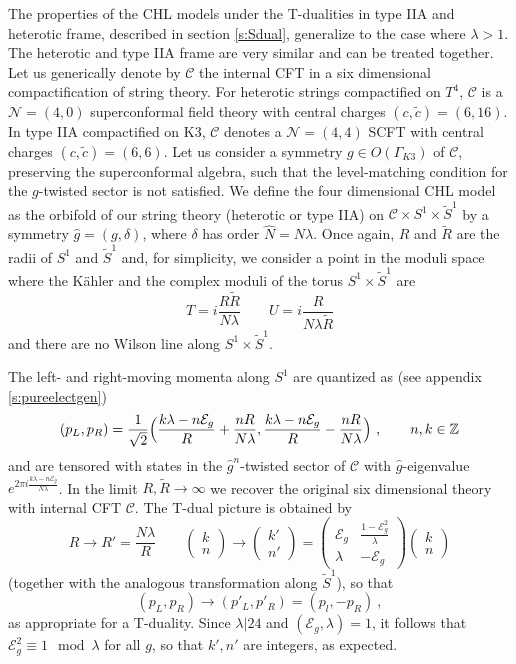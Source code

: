 \documentclass[a4paper,11pt]{article}
\newcommand{\ZZ}{\mathbb{Z}}
\newcommand{\C}{\mathcal{C}}
\newcommand{\E}{\mathcal{E}}
\newcommand{\N}{\mathcal{N}}
\numberwithin{equation}{section}
\def\be{\begin{equation}}
\def\ee{\end{equation}}
\begin{document}
The properties of the CHL models under the T-dualities in type IIA and heterotic frame, described in section \ref{s:Sdual}, generalize to the case where $\lambda>1$. The heterotic and type IIA frame are very similar and can be treated together. Let us generically denote by $\C$ the internal CFT in a six dimensional compactification of string theory. For heterotic strings compactified on $T^4$, $\C$ is a $\N=(4,0)$ superconformal field theory with central charges $(c,\tilde c)=(6,16)$. In type IIA compactified on K3, $\C$ denotes a $\N=(4,4)$ SCFT with central charges $(c,\tilde c)=(6,6)$. Let us consider a symmetry $g\in O(\Gamma_{K3})$ of $\C$, preserving the superconformal algebra, such that the level-matching condition for the $g$-twisted sector is not satisfied. We define the four dimensional CHL model as the orbifold of our string theory (heterotic or type IIA) on $\C\times S^1\times \tilde S^1$ by a symmetry $\hat g=(g,\delta)$, where $\delta$ has order $\hat N=N\lambda$. Once again, $R$ and $\tilde R$ are the radii of $S^1$ and $\tilde S^1$ and, for simplicity, we consider a point in the moduli space where the K\"ahler and the complex moduli of the torus $S^1\times\tilde S^1$ are 
\be T=i\frac{R\tilde R}{N\lambda}\qquad U=i\frac{R}{N\lambda\tilde R}
\ee and there are no Wilson line along $S^1\times \tilde S^1$. 

The left- and right-moving momenta along $S^1$ are quantized as (see appendix \ref{s:pureelectgen})
\be (p_L,p_R)=\frac{1}{\sqrt2}\Bigl(\frac{k\lambda-n\E_g}{R}+\frac{nR}{N\lambda },\frac{k\lambda-n\E_g}{R}-\frac{nR}{N\lambda }\Bigr)\ ,\qquad n,k\in\ZZ
\ee  and are tensored with states in the $\hat g^n$-twisted sector of $\C$ with $\hat g$-eigenvalue $e^{2\pi i\frac{k\lambda-n\E_g}{N\lambda}}$. In the limit $R,\tilde R\to \infty$ we recover the original six dimensional theory with internal CFT $\C$. The T-dual picture is obtained by
\be R\to R'=\frac{N\lambda }{R}\qquad \begin{pmatrix}
k\\ n
\end{pmatrix} \to \begin{pmatrix}
k'\\ n'
\end{pmatrix}=\begin{pmatrix}
\E_g & \frac{1-\E_g^2}{\lambda}\\ \lambda & -\E_g
\end{pmatrix}\begin{pmatrix}
k\\ n
\end{pmatrix}
\ee (together with the analogous transformation along $\tilde S^1$), so that
\be (p_L,p_R)\to (p'_L,p'_R)=(p_l,-p_R)\ ,
\ee as appropriate for a T-duality.
Since $\lambda|24$ and $(\E_g,\lambda)=1$, it follows that $\E_g^2\equiv 1\mod \lambda$ for all $g$, so that $k',n'$ are integers, as expected.
 
\end{document}
